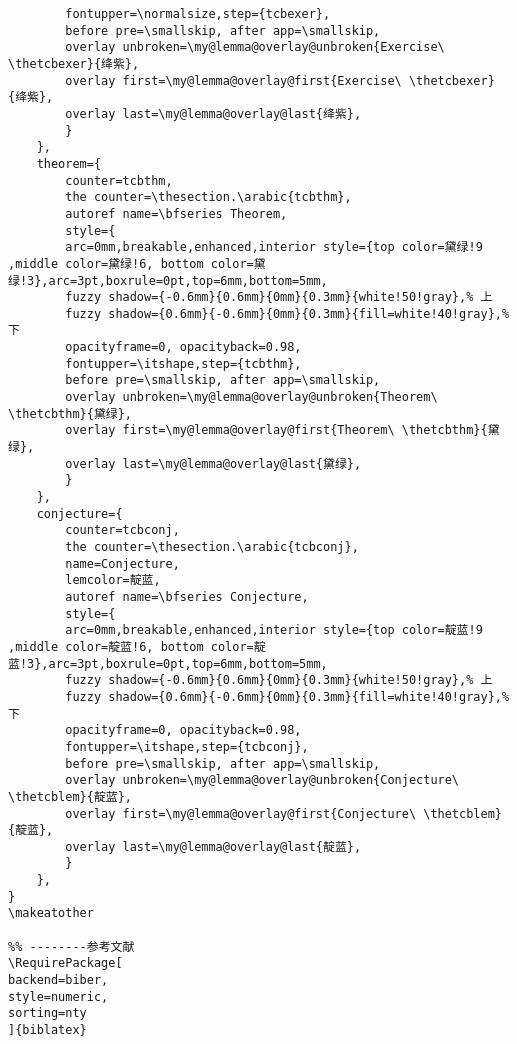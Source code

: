 \documentclass[lang=cn,zihao=-4,a4paper,fontset=windows]{beautybook}
\begin{document}
\begin{lstlisting}
        fontupper=\normalsize,step={tcbexer},
        before pre=\smallskip, after app=\smallskip,
        overlay unbroken=\my@lemma@overlay@unbroken{Exercise\ \thetcbexer}{绛紫},
        overlay first=\my@lemma@overlay@first{Exercise\ \thetcbexer}{绛紫},
        overlay last=\my@lemma@overlay@last{绛紫},
        }
    },
    theorem={
        counter=tcbthm,
        the counter=\thesection.\arabic{tcbthm},
        autoref name=\bfseries Theorem,
        style={
        arc=0mm,breakable,enhanced,interior style={top color=黛绿!9 ,middle color=黛绿!6, bottom color=黛绿!3},arc=3pt,boxrule=0pt,top=6mm,bottom=5mm,
        fuzzy shadow={-0.6mm}{0.6mm}{0mm}{0.3mm}{white!50!gray},% 上
        fuzzy shadow={0.6mm}{-0.6mm}{0mm}{0.3mm}{fill=white!40!gray},%下
        opacityframe=0, opacityback=0.98,
        fontupper=\itshape,step={tcbthm},
        before pre=\smallskip, after app=\smallskip,
        overlay unbroken=\my@lemma@overlay@unbroken{Theorem\ \thetcbthm}{黛绿},
        overlay first=\my@lemma@overlay@first{Theorem\ \thetcbthm}{黛绿},
        overlay last=\my@lemma@overlay@last{黛绿},
        }
    },
    conjecture={
        counter=tcbconj,
        the counter=\thesection.\arabic{tcbconj},
        name=Conjecture, 
        lemcolor=靛蓝, 
        autoref name=\bfseries Conjecture,
        style={
        arc=0mm,breakable,enhanced,interior style={top color=靛蓝!9 ,middle color=靛蓝!6, bottom color=靛蓝!3},arc=3pt,boxrule=0pt,top=6mm,bottom=5mm,
        fuzzy shadow={-0.6mm}{0.6mm}{0mm}{0.3mm}{white!50!gray},% 上
        fuzzy shadow={0.6mm}{-0.6mm}{0mm}{0.3mm}{fill=white!40!gray},%下
        opacityframe=0, opacityback=0.98,
        fontupper=\itshape,step={tcbconj},
        before pre=\smallskip, after app=\smallskip,
        overlay unbroken=\my@lemma@overlay@unbroken{Conjecture\ \thetcblem}{靛蓝},
        overlay first=\my@lemma@overlay@first{Conjecture\ \thetcblem}{靛蓝},
        overlay last=\my@lemma@overlay@last{靛蓝},
        }
    },
}
\makeatother

%% --------参考文献
\RequirePackage[
backend=biber,
style=numeric,
sorting=nty
]{biblatex}



\end{lstlisting}
\end{document}
